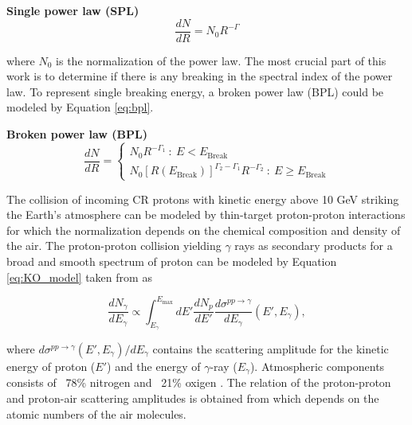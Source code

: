 \textbf{Single power law (SPL)}
\begin{equation}
    \frac{dN}{dR} = N_0R^{-\Gamma}
    \label{eq:spl}
\end{equation}

where $N_0$ is the normalization of the power law.
The most crucial part of this work is to determine if there is any 
breaking in the spectral index of the power law. To represent 
single breaking energy, a broken power law (BPL) could be modeled 
by Equation \ref{eq:bpl}. 


\textbf{Broken power law (BPL)}
\begin{equation}
\frac{dN}{dR}=
  \begin{cases}
    N_0R^{-\Gamma_1}\ :\ E < E_{\text{Break}}\\
    N_0[R(E_{\text{Break}})]^{\Gamma_2-\Gamma_1}R^{-\Gamma_2}\ :\ E \ge E_{\text{Break}}
  \end{cases}
  \label{eq:bpl}
\end{equation}

The collision of incoming CR protons with kinetic 
energy above 10 GeV striking the Earth's atmosphere
can be modeled by
thin-target proton-proton interactions for which the normalization
depends on the chemical composition and density of the air.
The proton-proton collision yielding $\gamma$ rays
as secondary products for a broad and smooth spectrum
of proton can be modeled by Equation \ref{eq:KO_model}
taken from \cite{K&Omodel} as 

\begin{equation}
    \frac{dN_\gamma}{dE_\gamma} \propto \int^{E_{\text{max}}}_{E_\gamma} dE'\frac{dN_p}{dE'} \frac{d\sigma^{pp\rightarrow\gamma}}{dE_\gamma}(E',E_\gamma),
    \label{eq:KO_model}
\end{equation}

\noindent where $d\sigma^{pp\rightarrow\gamma}(E',E_\gamma)/dE_\gamma$ contains 
the scattering amplitude
for the kinetic energy of proton ($E'$) and the
energy of $\gamma$-ray ($E_\gamma$).
Atmospheric components
consists of ~78\% nitrogen and ~21\% oxigen
\citep{atmosCompos}.
The relation of the proton-proton 
and proton-air scattering amplitudes
is obtained from \cite{WAtwater}
which depends on the
atomic numbers of the air molecules. 


